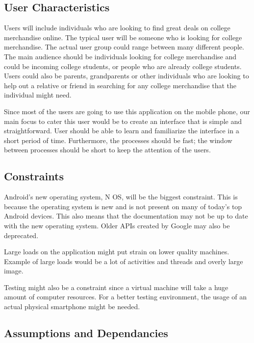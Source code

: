 \documentclass[journal,compsoc, 10pt, draftclsnofoot, onecolumn]{IEEEtran}
\begin{document}
\subsection{User Characteristics}

Users will include individuals who are looking to find great deals on college 
merchandise online. The typical user will be someone who is looking for college 
merchandise. The actual user group could range between many different people. 
The main audience should be individuals looking for college merchandise and 
could be incoming college students, or people who are already college students. 
Users could also be parents, grandparents or other individuals who are looking 
to help out a relative or friend in searching for any college merchandise that 
the individual might need. \newline

Since most of the users are going to use this application on the mobile phone, 
our main focus to cater this user would be to create an interface that is simple
 and straightforward. User should be able to learn and familiarize the interface
 in a short period of time. Furthermore, the processes should be fast; the 
window between processes should be short to keep the attention of the users.

\subsection{Constraints}

Android's new operating system, N OS, will be the biggest constraint. This is 
because the operating system is new and is not present on many of today's top 
Android devices. This also means that the documentation may not be up to date 
with the new operating system. Older APIs created by Google may also be
 deprecated.\newline

Large loads on the application might put strain on lower quality machines. 
Example of large loads would be a lot of activities and threads and overly 
large image. 

Testing might also be a constraint since a virtual machine will take a huge 
amount of computer resources. For a better testing environment, the usage of an 
actual physical smartphone might be needed.

\subsection{Assumptions and Dependancies}
\end{document}
